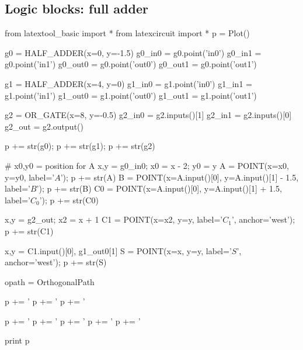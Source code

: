 \subsection{Logic blocks: full adder}
\begin{python}
from latextool_basic import *
from latexcircuit import *
p = Plot()

g0 = HALF_ADDER(x=0, y=-1.5)
g0_in0 = g0.point('in0')
g0_in1 = g0.point('in1')
g0_out0 = g0.point('out0')
g0_out1 = g0.point('out1')

g1 = HALF_ADDER(x=4, y=0)
g1_in0 = g1.point('in0')
g1_in1 = g1.point('in1')
g1_out0 = g1.point('out0')
g1_out1 = g1.point('out1')

g2 = OR_GATE(x=8, y=-0.5)
g2_in0 = g2.inputs()[1]
g2_in1 = g2.inputs()[0]
g2_out = g2.output()

p += str(g0); p += str(g1); p += str(g2)

# x0,y0 = position for A 
x,y = g0_in0; x0 = x - 2; y0 = y
A = POINT(x=x0, y=y0, label='$A$'); p += str(A)
B = POINT(x=A.input()[0], y=A.input()[1] - 1.5, label='$B$'); p += str(B)
C0 = POINT(x=A.input()[0], y=A.input()[1] + 1.5, label='$C_0$'); p += str(C0)

x,y = g2_out; x2 = x + 1
C1 = POINT(x=x2, y=y, label='$C_1$', anchor='west'); p += str(C1)

x,y = C1.input()[0], g1_out0[1]
S = POINT(x=x, y=y, label='$S$', anchor='west'); p += str(S)

opath = OrthogonalPath

p += '%
p += '%
p += '%

p += '%
p += '%
p += '%
p += '%
p += '%

print p
\end{python}




